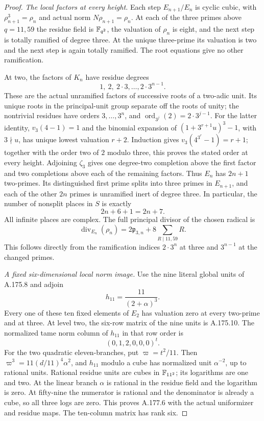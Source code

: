 \begin{proof}
\emph{The local factors at every height.}
Each step $E_{n+1}/E_n$ is cyclic cubic, with
$\rho_{n+1}^3=\rho_n$ and actual norm $N\rho_{n+1}=\rho_n$.
At each of the three primes above $q=11,59$ the residue field is
$\mathbb F_{q^2}$, the valuation of $\rho_n$ is eight, and the next step
is totally ramified of degree three.  At the unique three-prime
its valuation is two and the next step is again totally ramified.
The root equations give no other ramification.

At two, the factors of $K_n$ have residue degrees
\[
                  1,\ 2,\ 2\cdot3,\ldots,2\cdot3^{n-1}.
\tag{A.177.2}
\]
These are the actual unramified factors of successive roots of a
two-adic unit.  Its unique roots in the principal-unit group separate
off the roots of unity; the nontrivial residues have orders
$3,\ldots,3^n$, and $\operatorname{ord}_{3^j}(2)=2\cdot3^{j-1}$.
For the latter identity, $v_3(4-1)=1$ and the binomial expansion
of $(1+3^{r+1}u)^3-1$, with $3\nmid u$, has unique lowest
valuation $r+2$.  Induction gives
$v_3(4^{3^r}-1)=r+1$; together with the order two of $2$ modulo
three, this proves the stated order at every height.
Adjoining $\zeta_3$ gives one degree-two completion above the first
factor and two completions above each of the remaining factors.
Thus $E_n$ has $2n+1$ two-primes.  Its distinguished first prime
splits into three primes in $E_{n+1}$, and each of the other $2n$
primes is unramified inert of degree three.  In particular, the
number of nonsplit places in $S$ is exactly
\[
                          2n+6+1=2n+7.
\tag{A.177.3}
\]
All infinite places are complex.  The full principal divisor of the
chosen radical is
\[
 \operatorname{div}_{E_n}(\rho_n)
      =2\mathfrak p_{3,n}+8\sum_{R\mid11,59}R .
\tag{A.177.4}
\]
This follows directly from the ramification indices
$2\cdot3^n$ at three and $3^{n-1}$ at the changed primes.

\emph{A fixed six-dimensional local norm image.}
Use the nine literal global units of A.175.8 and adjoin
\[
                         h_{11}=\frac{11}{(2+\alpha)^3}.
\tag{A.177.5}
\]
Every one of these ten fixed elements of $E_2$ has valuation zero
at every two-prime and at three.  At level two, the six-row matrix
of the nine units is A.175.10.  The normalized tame norm column
of $h_{11}$ in that row order is
\[
                             (0,1,2,0,0,0)^t.
\tag{A.177.6}
\]
For the two quadratic eleven-branches, put $\varpi=t^2/11$.
Then $\varpi^3=11(d/11)^4\alpha^2$, and $h_{11}$ modulo a
cube has normalized unit $\alpha^{-2}$, up to rational units.
Rational residue units are cubes in $\mathbb F_{11^2}$; its logarithms
are one and two.  At the linear branch $\alpha$ is rational in
the residue field and the logarithm is zero.  At fifty-nine the
numerator is rational and the denominator is already a cube, so
all three logs are zero.  This proves A.177.6 with the actual
uniformizer and residue maps.  The ten-column matrix has rank six.


\end{proof}
